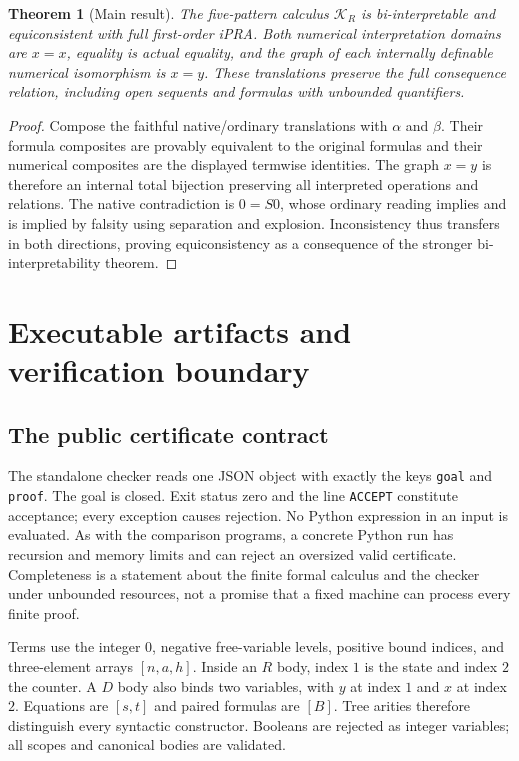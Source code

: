 \documentclass[11pt,letterpaper]{article}
\newtheorem{theorem}{Theorem}[section]
\theoremstyle{definition}
\newcommand{\K}{\mathcal K_R}
\newcommand{\code}[1]{\texttt{#1}}
\begin{document}
\begin{theorem}[Main result]
The five-pattern calculus $\K$ is bi-interpretable and equiconsistent
with full first-order iPRA. Both numerical interpretation domains are
$x=x$, equality is actual equality, and the graph of each internally
definable numerical isomorphism is $x=y$. These translations preserve
the full consequence relation, including open sequents and formulas
with unbounded quantifiers.
\end{theorem}
\begin{proof}
Compose the faithful native/ordinary translations with $\alpha$ and
$\beta$. Their formula composites are provably equivalent to the
original formulas and their numerical composites are the displayed
termwise identities. The graph $x=y$ is therefore an internal total
bijection preserving all interpreted operations and relations.
The native contradiction is $0=S0$, whose ordinary reading implies
and is implied by falsity using separation and explosion. Inconsistency
thus transfers in both directions, proving equiconsistency as a
consequence of the stronger bi-interpretability theorem.
\end{proof}

\section{Executable artifacts and verification boundary}
\label{sec:implementation}

\subsection{The public certificate contract}

The standalone checker reads one JSON object with exactly the keys
\code{goal} and \code{proof}. The goal is closed. Exit status zero
and the line \code{ACCEPT} constitute acceptance; every exception
causes rejection. No Python expression in an input is evaluated.
As with the comparison programs, a concrete Python run has recursion
and memory limits and can reject an oversized valid certificate.
Completeness is a statement about the finite formal calculus and
the checker under unbounded resources, not a promise that a fixed
machine can process every finite proof.

Terms use the integer $0$, negative free-variable levels, positive
bound indices, and three-element arrays $[n,a,h]$. Inside an $R$
body, index $1$ is the state and index $2$ the counter. A $D$ body
also binds two variables, with $y$ at index $1$ and $x$ at index $2$.
Equations are $[s,t]$ and paired formulas are $[B]$. Tree arities
therefore distinguish every syntactic constructor. Booleans are
rejected as integer variables; all scopes and canonical bodies are
validated.
\end{document}

